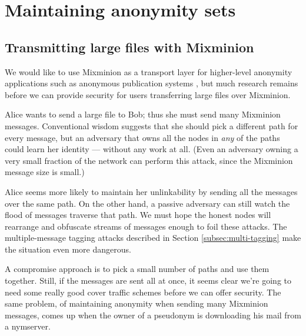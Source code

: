 \documentclass{llncs}
\begin{document}

\section{Maintaining anonymity sets}
\label{sec:maintaining-anonymity}

\subsection{Transmitting large files with Mixminion}

We would like to use Mixminion as a transport layer for higher-level
anonymity applications such as anonymous publication systems
\cite{freehaven-berk}, but much research remains before we can
provide security for users transferring large files over Mixminion.

Alice wants to send a large file to Bob; thus she must send many Mixminion
messages. Conventional wisdom suggests that she should pick a different
path for every message, but an adversary that owns all the nodes in
\emph{any} of the paths could learn her identity --- without any work
at all. (Even an adversary owning a very small fraction of the network
can perform this attack, since the Mixminion message size is small.)


Alice seems more likely to maintain her unlinkability by sending all the
messages over the same path. On the other hand, a passive adversary can
still watch the flood of messages traverse that path. We must hope the
honest nodes will rearrange and obfuscate streams of messages enough to
foil these attacks. The multiple-message tagging attacks described in
Section \ref{subsec:multi-tagging} make the situation even more dangerous.

A compromise approach is to pick a small number of paths and use them
together. Still, if the messages are sent all at once, it seems clear
we're going to need some really good cover traffic schemes before we
can offer security. The same problem, of maintaining anonymity when
sending many Mixminion messages, comes up when the owner of a pseudonym
is downloading his mail from a nymserver.
\end{document}
